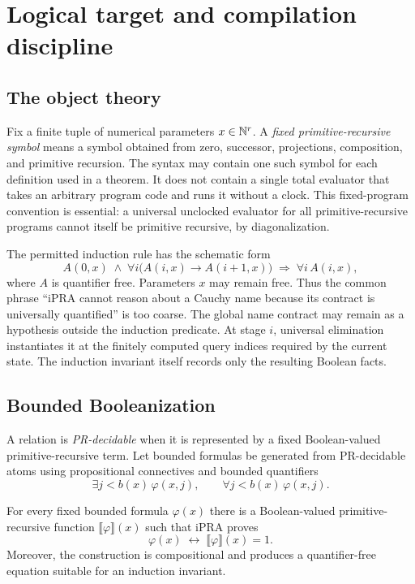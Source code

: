 \section{Logical target and compilation discipline}
\label{sec:logic}

\subsection{The object theory}

Fix a finite tuple of numerical parameters $x\in\mathbb N^r$.  A \emph{fixed primitive-recursive symbol} means a symbol obtained from zero, successor, projections, composition, and primitive recursion.  The syntax may contain one such symbol for each definition used in a theorem.  It does not contain a single total evaluator that takes an arbitrary program code and runs it without a clock.  This fixed-program convention is essential: a universal unclocked evaluator for all primitive-recursive programs cannot itself be primitive recursive, by diagonalization.

The permitted induction rule has the schematic form
\[
  A(0,x)\;\wedge\;\forall i\bigl(A(i,x)\to A(i+1,x)\bigr)
  \;\Longrightarrow\;\forall i\,A(i,x),
\]
where $A$ is quantifier free.  Parameters $x$ may remain free.  Thus the common phrase ``iPRA cannot reason about a Cauchy name because its contract is universally quantified'' is too coarse.  The global name contract may remain as a hypothesis outside the induction predicate.  At stage $i$, universal elimination instantiates it at the finitely computed query indices required by the current state.  The induction invariant itself records only the resulting Boolean facts.

\subsection{Bounded Booleanization}

A relation is \emph{PR-decidable} when it is represented by a fixed Boolean-valued primitive-recursive term.  Let bounded formulas be generated from PR-decidable atoms using propositional connectives and bounded quantifiers
\[
  \exists j<b(x)\,\varphi(x,j),\qquad
  \forall j<b(x)\,\varphi(x,j).
\]

\begin{theorem}
\label{thm:booleanization}
For every fixed bounded formula $\varphi(x)$ there is a Boolean-valued primitive-recursive function $\llbracket\varphi\rrbracket(x)$ such that iPRA proves
\[
  \varphi(x)\;\leftrightarrow\;\llbracket\varphi\rrbracket(x)=1.
\]
Moreover, the construction is compositional and produces a quantifier-free equation suitable for an induction invariant.
\end{theorem}

